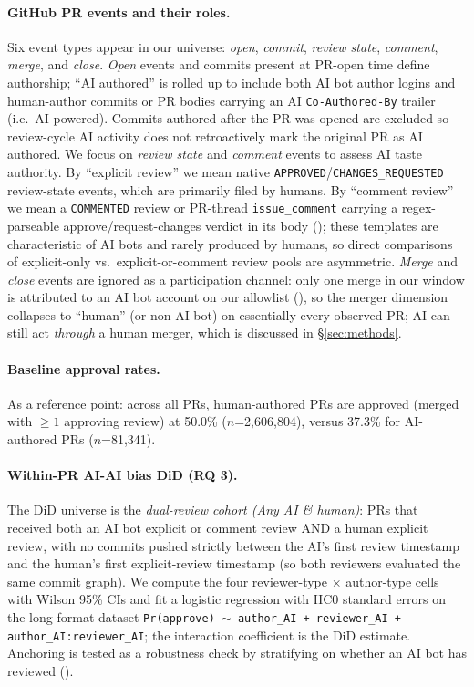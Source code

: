 
\paragraph{GitHub PR events and their roles.} Six event types appear in our universe: \emph{open}, \emph{commit}, \emph{review state}, \emph{comment}, \emph{merge}, and \emph{close}. \emph{Open} events and commits present at PR-open time define authorship; ``AI authored'' is rolled up to include both AI bot author logins and human-author commits or PR bodies carrying an AI \texttt{Co-Authored-By} trailer (i.e.\ AI powered). Commits authored after the PR was opened are excluded so review-cycle AI activity does not retroactively mark the original PR as AI authored. We focus on \emph{review state} and \emph{comment} events to assess AI taste authority. By ``explicit review'' we mean native \texttt{APPROVED}/\texttt{CHANGES\_REQUESTED} review-state events, which are primarily filed by humans. By ``comment review'' we mean a \texttt{COMMENTED} review or PR-thread \texttt{issue\_comment} carrying a regex-parseable approve/request-changes verdict in its body (); these templates are characteristic of AI bots and rarely produced by humans, so direct comparisons of explicit-only vs.\ explicit-or-comment review pools are asymmetric. \emph{Merge} and \emph{close} events are ignored as a participation channel: only one merge in our window is attributed to an AI bot account on our allowlist (\citealp{githubinfisical2026}), so the merger dimension collapses to ``human'' (or non-AI bot) on essentially every observed PR; AI can still act \emph{through} a human merger, which is discussed in §\ref{sec:methods}.

\paragraph{Baseline approval rates.} As a reference point: across all PRs, human-authored PRs are approved (merged with $\geq 1$ approving review) at 50.0\% ($n$=2,606,804), versus 37.3\% for AI-authored PRs ($n$=81,341).

\paragraph{Within-PR AI-AI bias DiD (RQ 3).} The DiD universe is the \emph{dual-review cohort (Any AI \& human)}: PRs that received both an AI bot explicit or comment review AND a human explicit review, with no commits pushed strictly between the AI's first review timestamp and the human's first explicit-review timestamp (so both reviewers evaluated the same commit graph). We compute the four reviewer-type $\times$ author-type cells with Wilson 95\% CIs and fit a logistic regression with HC0 standard errors on the long-format dataset \texttt{Pr(approve) $\sim$ author\_AI + reviewer\_AI + author\_AI:reviewer\_AI}; the interaction coefficient is the DiD estimate. Anchoring is tested as a robustness check by stratifying on whether an AI bot has reviewed ().

